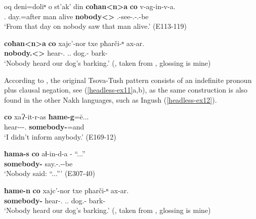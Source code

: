 \begin{exe}
	\ex\label{headless-ex010}
	\begin{xlist}
		
		\ex\label{headless-ex010a}
		\gll oq deni=doliⁿ o st'ak' din \textbf{coħan<n>a} \textbf{co} v-ag-in-v-a. \\
		{\Dist}.{\Obl} day.{\Obl}=after {\Dist} man alive \textbf{nobody<{\Dat}>} \textbf{{\Neg}} {\M}.{\Sg}-see-{\Ptcp}.{\Pst}-{\M}.{\Sg}-be \\
		\trans `From that day on nobody saw that man alive.'
		\hfill (E113-119)
		
		\ex\label{headless-ex010b}
		\gll \textbf{coħan<n>a} \textbf{co} xajc’-nor txe pħarči-ⁿ ax-ar. \\
		\textbf{nobody.{\Obl}<{\Dat}>} \textbf{{\Neg}} hear-{\Nw}.{\Rem} {\Fpl}.{\Gen}.{\Obl} dog.{\Pl}-{\Gen} bark-{\Vn} \\
		\trans `Nobody heard our dog’s barking.’
		\hfill (\cite[202]{mikeladze11}, taken from \textcite{ankernegation}, glossing is mine)
		
	\end{xlist}
\end{exe}


According to \textcite[202]{mikeladze11}, the original Tsova-Tush pattern consists of an indefinite pronoun plus clausal negation, see (\ref{headless-ex11}a,b), as the same construction is also found in the other Nakh languages, such as Ingush (\ref{headless-ex12}).

\begin{exe}
	\ex\label{headless-ex11}
	\begin{xlist}
		
		\ex\label{headless-ex11a}
		\gll \textbf{co} xaɁ-it-r-as \textbf{ħame-g}=ē... \\
		\textbf{{\Neg}} hear-{\Caus}-{\Imprf}-{\Fsg}.{\Erg} \textbf{somebody-{\All}}=and \\
		\trans `I didn't inform anybody.'
		\hfill (E169-12)
		
		\ex\label{headless-ex11b}
		\gll  \textbf{ħama-s} \textbf{co} aɬ-in-d-a - ``...'' \\
		\textbf{somebody-{\Erg}} \textbf{{\Neg}} say.{\Pfv}-{\Ptcp}.{\Pst}-{\D}-be \\
		\trans `Nobody said: ``...{''}'
		\hfill (E307-40)
		
		
		\ex\label{headless-ex11c}
		\gll \textbf{ħame-n} \textbf{co} xajc'-nor txe pħarči-ⁿ ax-ar. \\
		\textbf{somebody-{\Dat}} \textbf{{\Neg}} hear-{\Nw}.{\Rem} {\Fpl}.{\Gen}.{\Obl} dog.{\Pl}-{\Gen} bark-{\Vn} \\
		\trans `Nobody heard our dog’s barking.’
		\hfill (\cite[202]{mikeladze11}, taken from \textcite{ankernegation}, glossing is mine)
		
	\end{xlist}
\end{exe}


